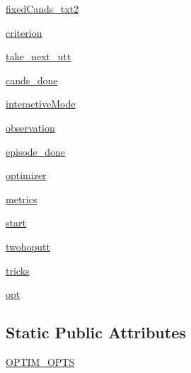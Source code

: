 \begin{DoxyCompactItemize}
\item 
\hyperlink{classprojects_1_1personachat_1_1kvmemnn_1_1kvmemnn_1_1KvmemnnAgent_a1f97013332930c41aa8839be4fc78b40}{fixed\+Cands\+\_\+txt2}
\item 
\hyperlink{classprojects_1_1personachat_1_1kvmemnn_1_1kvmemnn_1_1KvmemnnAgent_a8a124eccb81be3ce6c44ccb3974acc68}{criterion}
\item 
\hyperlink{classprojects_1_1personachat_1_1kvmemnn_1_1kvmemnn_1_1KvmemnnAgent_a197c4ee11a4536d738a632f46847cc89}{take\+\_\+next\+\_\+utt}
\item 
\hyperlink{classprojects_1_1personachat_1_1kvmemnn_1_1kvmemnn_1_1KvmemnnAgent_a4e00699d90d4efcc4c7565877a3d2adc}{cands\+\_\+done}
\item 
\hyperlink{classprojects_1_1personachat_1_1kvmemnn_1_1kvmemnn_1_1KvmemnnAgent_aad3af91663688393121d6475cadec9cc}{interactive\+Mode}
\item 
\hyperlink{classprojects_1_1personachat_1_1kvmemnn_1_1kvmemnn_1_1KvmemnnAgent_afd7921cc7a7e9aa7a8d3a454cf6d6176}{observation}
\item 
\hyperlink{classprojects_1_1personachat_1_1kvmemnn_1_1kvmemnn_1_1KvmemnnAgent_a6026c6d8fc17ff4dd51536087fce18b5}{episode\+\_\+done}
\item 
\hyperlink{classprojects_1_1personachat_1_1kvmemnn_1_1kvmemnn_1_1KvmemnnAgent_ae9a0118914d6d1c9be4ecc428934b537}{optimizer}
\item 
\hyperlink{classprojects_1_1personachat_1_1kvmemnn_1_1kvmemnn_1_1KvmemnnAgent_aca0257f35b72dc504f9edc52a7de433e}{metrics}
\item 
\hyperlink{classprojects_1_1personachat_1_1kvmemnn_1_1kvmemnn_1_1KvmemnnAgent_a18725fe3d8fafd7f7bb77375d9746243}{start}
\item 
\hyperlink{classprojects_1_1personachat_1_1kvmemnn_1_1kvmemnn_1_1KvmemnnAgent_abfdc212a6bfaa2af3eafcff11734d05c}{twohoputt}
\item 
\hyperlink{classprojects_1_1personachat_1_1kvmemnn_1_1kvmemnn_1_1KvmemnnAgent_a17cc75d3ddbb3859ad5bee04542acd53}{tricks}
\item 
\hyperlink{classprojects_1_1personachat_1_1kvmemnn_1_1kvmemnn_1_1KvmemnnAgent_a4e25d0aaf32c5bcc9429c6825ba214c4}{opt}
\end{DoxyCompactItemize}
\subsection*{Static Public Attributes}
\begin{DoxyCompactItemize}
\item 
\hyperlink{classprojects_1_1personachat_1_1kvmemnn_1_1kvmemnn_1_1KvmemnnAgent_a0e510a2935777fbec0fb930628377415}{O\+P\+T\+I\+M\+\_\+\+O\+P\+TS}
\end{DoxyCompactItemize}


